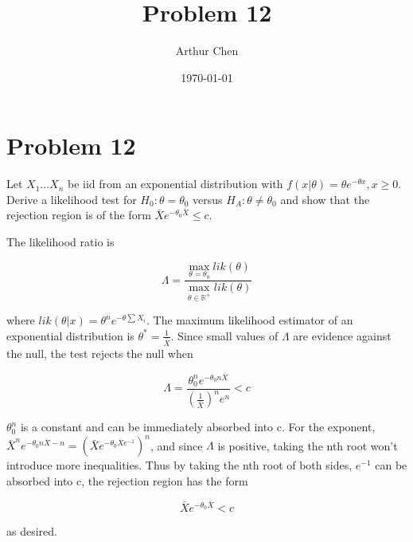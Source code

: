 \documentclass{article}
\author{Arthur Chen}
\title{Problem 12}
\date{\today}
\begin{document}
\section*{Problem 12}

Let $X_1 \dots X_n$ be iid from an exponential distribution with $f(x|\theta) = \theta e^{-\theta x}, x \geq 0$. Derive a likelihood test for $H_0: \theta = \theta_0$ versus $H_A: \theta \neq \theta_0$ and show that the rejection region is of the form $\bar{X} e^{-\theta_0 \bar{X}} \leq c$.

The likelihood ratio is

\[
\Lambda = \frac{\max_{\theta = \theta_0} lik(\theta)}
{\max_{\theta \in \mathbb{R^+}} lik(\theta)}
\]

where $lik(\theta|x) = \theta^n e^{-\theta \sum X_i}$. The maximum likelihood estimator of an exponential distribution is $\theta^* = \frac{1}{\bar{X}}$. Since small values of $\Lambda$ are evidence against the null, the test rejects the null when

\[
\Lambda = \frac{\theta_0^n e^{-\theta_0 n \bar{X}}}
{(\frac{1}{\bar{X}})^n e^n} < c
\]

$\theta_0^n$ is a constant and can be immediately absorbed into c. For the exponent, $\bar{X}^n e^{-\theta_0 n \bar{X} - n} = (\bar{X}e^{-\theta_0 \bar{X}e^{-1}})^n$, and since $\Lambda$ is positive, taking the nth root won't introduce more inequalities. Thus by taking the nth root of both sides, $e^{-1}$ can be absorbed into c, the rejection region has the form

\[
\bar{X} e^{-\theta_0 \bar{X}} < c
\]

as desired.
\end{document}
